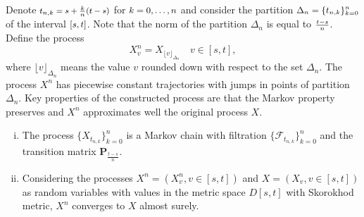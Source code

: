 Denote  $\mbox{\footnotesize{$t_{n,k}=s+\tfrac{k}{n}(t-s)$}}$ for $\mbox{\small{$k=0,\dots,n$}}$ and consider the partition $\mbox{\small{$\Delta_n=\{t_{n,k}\}_{k=0}^n$}}$ of the interval $\mbox{\small{$[s,t]$}}$. Note that the norm of the partition $\Delta_n$ is equal to $\mbox{\footnotesize{$\tfrac{t-s}{n}$}}$. Define the process
\[ X^{n}_v=X_{\lfloor v \rfloor_{\Delta_n}} \quad v\in[s,t],\]
where $\lfloor v \rfloor_{\Delta_n}$ means the value $v$ rounded down with respect to the set $\Delta_n$. The process $X^{n}$ has piecewise constant trajectories with jumps in points of partition $\Delta_n$.  Key properties of the constructed process are that the Markov property preserves and $X^{n}$ approximates well the original process $X$.
\begin{lem}
\label{Skorochod}
\begin{enumerate}[(i)]
\item The process $\{X_{t_{n,k}}\}_{k=0}^n$ is a Markov chain with filtration %
$\{\mathcal{F}_{t_{n,k}}\}_{k=0}^n$ and the transition matrix $\bm{P}_{\frac{t-s}{n}}$.
\item Considering the processes $X^n=(X^{n}_v, v\in[s,t])$ and $X=(X_v,v\in[s,t])$ as random variables with values in the metric space $D[s,t]$ with Skorokhod metric,  $X^n$ converges to $X$ almost surely.
\end{enumerate}
\end{lem}
